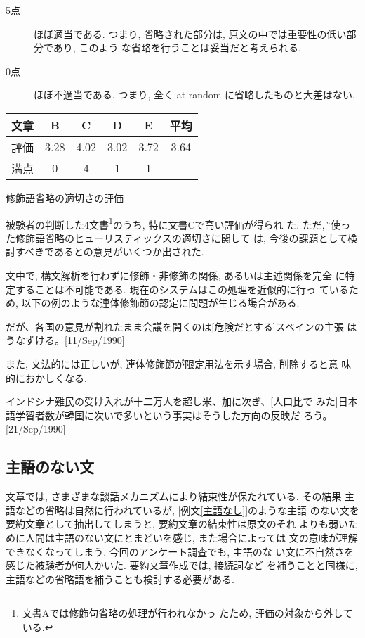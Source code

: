 \begin{description}
\item[5点]ほぼ適当である. 
つまり, 省略された部分は, 原文の中では重要性の低い部分であり, このよう
な省略を行うことは妥当だと考えられる. 
\item[0点]ほぼ不適当である. 
つまり, 全く at random に省略したものと大差はない. 
\end{description}

\begin{center}
\begin{tabular}{|c||c|c|c|c||c|}
\hline
文章 & B & C & D & E & 平均 \\
\hline
評価 & 3.28 & 4.02 & 3.02 & 3.72 & 3.64 \\
満点 & 0 & 4 & 1 & 1 & \\
\hline
\end{tabular}
\caption{修飾語省略の適切さの評価}
\end{center}

被験者の判断した4文書\footnote{文書Aでは修飾句省略の処理が行われなかっ
たため, 評価の対象から外している. }のうち, 特に文書Cで高い評価が得られ
た. ただ, \G で使った修飾語省略のヒューリスティックスの適切さに関して
は, 今後の課題として検討すべきであるとの意見がいくつか出された. 

文中で, 構文解析を行わずに修飾・非修飾の関係, あるいは主述関係を完全
に特定することは不可能である. 現在のシステムはこの処理を近似的に行っ
ているため, 以下の例のような連体修飾節の認定に問題が生じる場合がある. 

\begin{sample}
\item
だが、各国の意見が割れたまま会議を開くのは[危険だとする]スペインの主張
はうなずける。[11/Sep/1990]
\end{sample}

また, 文法的には正しいが, 連体修飾節が限定用法を示す場合, 削除すると意
味的におかしくなる. 

\begin{sample}
\item インドシナ難民の受け入れが十二万人を超し米、加に次ぎ、[人口比で
みた]日本語学習者数が韓国に次いで多いという事実はそうした方向の反映だ
ろう。[21/Sep/1990]
\end{sample}


\subsection{主語のない文}
文章では, さまざまな談話メカニズムにより結束性が保たれている. その結果
主
語などの省略は自然に行われているが, [例文\ref{主語なし}]のような主語
のない文を要約文章として抽出してしまうと, 要約文章の結束性は原文のそれ
よりも弱いために人間は主語のない文にとまどいを感じ, また場合によっては
文の意味が理解できなくなってしまう. 今回のアンケート調査でも, 主語のな
い文に不自然さを感じた被験者が何人かいた. 要約文章作成では, 接続詞など
を補うことと同様に, 主語などの省略語を補うことも検討する必要がある. 

